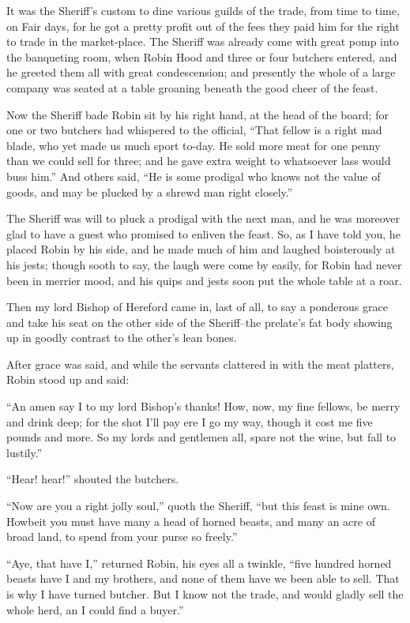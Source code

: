 It was the Sheriff's custom to dine various guilds of the trade, from
time to time, on Fair days, for he got a pretty profit out of the fees
they paid him for the right to trade in the market-place. The Sheriff
was already come with great pomp into the banqueting room, when Robin
Hood and three or four butchers entered, and he greeted them all with
great condescension; and presently the whole of a large company was
seated at a table groaning beneath the good cheer of the feast.

Now the Sheriff bade Robin sit by his right hand, at the head of the
board; for one or two butchers had whispered to the official, ``That
fellow is a right mad blade, who yet made us much sport to-day. He sold
more meat for one penny than we could sell for three; and he gave extra
weight to whatsoever lass would buss him.'' And others said, ``He is
some prodigal who knows not the value of goods, and may be plucked by a
shrewd man right closely.''

The Sheriff was will to pluck a prodigal with the next man, and he was
moreover glad to have a guest who promised to enliven the feast. So, as
I have told you, he placed Robin by his side, and he made much of him
and laughed boisterously at his jests; though sooth to say, the laugh
were come by easily, for Robin had never been in merrier mood, and his
quips and jests soon put the whole table at a roar.

Then my lord Bishop of Hereford came in, last of all, to say a ponderous
grace and take his seat on the other side of the Sheriff--the prelate's
fat body showing up in goodly contrast to the other's lean bones.

After grace was said, and while the servants clattered in with the meat
platters, Robin stood up and said:

``An amen say I to my lord Bishop's thanks! How, now, my fine fellows,
be merry and drink deep; for the shot I'll pay ere I go my way, though
it cost me five pounds and more. So my lords and gentlemen all, spare
not the wine, but fall to lustily.''

``Hear! hear!'' shouted the butchers.

``Now are you a right jolly soul,'' quoth the Sheriff, ``but this feast
is mine own. Howbeit you must have many a head of horned beasts, and
many an acre of broad land, to spend from your purse so freely.''

``Aye, that have I,'' returned Robin, his eyes all a twinkle, ``five
hundred horned beasts have I and my brothers, and none of them have we
been able to sell. That is why I have turned butcher. But I know not the
trade, and would gladly sell the whole herd, an I could find a buyer.''

